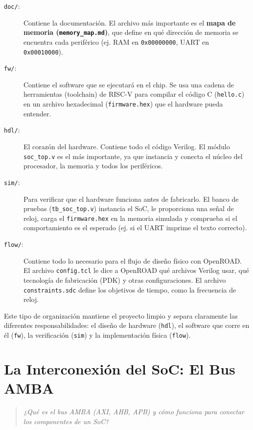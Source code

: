 \documentclass[12pt,a4paper]{article}
\newenvironment{pregunta}
  {\begin{leftbar}\begin{quote}\itshape}
  {\end{quote}\end{leftbar}}
\begin{document}
\begin{description}
    \item[\texttt{doc/}:] Contiene la documentación. El archivo más importante es el \textbf{mapa de memoria (\texttt{memory\_map.md})}, que define en qué dirección de memoria se encuentra cada periférico (ej. RAM en \texttt{0x00000000}, UART en \texttt{0x00010000}).
    
    \item[\texttt{fw/}:] Contiene el software que se ejecutará en el chip. Se usa una cadena de herramientas (toolchain) de RISC-V para compilar el código C (\texttt{hello.c}) en un archivo hexadecimal (\texttt{firmware.hex}) que el hardware pueda entender.
    
    \item[\texttt{hdl/}:] El corazón del hardware. Contiene todo el código Verilog. El módulo \texttt{soc\_top.v} es el más importante, ya que instancia y conecta el núcleo del procesador, la memoria y todos los periféricos.
    
    \item[\texttt{sim/}:] Para verificar que el hardware funciona antes de fabricarlo. El banco de pruebas (\texttt{tb\_soc\_top.v}) instancia el SoC, le proporciona una señal de reloj, carga el \texttt{firmware.hex} en la memoria simulada y comprueba si el comportamiento es el esperado (ej. si el UART imprime el texto correcto).
    
    \item[\texttt{flow/}:] Contiene todo lo necesario para el flujo de diseño físico con OpenROAD. El archivo \texttt{config.tcl} le dice a OpenROAD qué archivos Verilog usar, qué tecnología de fabricación (PDK) y otras configuraciones. El archivo \texttt{constraints.sdc} define los objetivos de tiempo, como la frecuencia de reloj.
\end{description}

Este tipo de organización mantiene el proyecto limpio y separa claramente las diferentes responsabilidades: el diseño de hardware (\texttt{hdl}), el software que corre en él (\texttt{fw}), la verificación (\texttt{sim}) y la implementación física (\texttt{flow}).

\newpage
\section{La Interconexión del SoC: El Bus AMBA}

\begin{pregunta}
¿Qué es el bus AMBA (AXI, AHB, APB) y cómo funciona para conectar los componentes de un SoC?
\end{pregunta}
\end{document}
